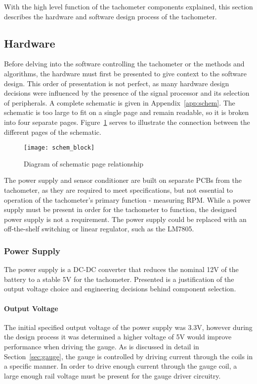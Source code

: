 With the high level function of the tachometer components explained, this section describes the hardware and software design process of the tachometer. 

\subsection{Hardware}
Before delving into the software controlling the tachometer or the methods and algorithms, the hardware must first be presented to give context to the software design. This order of presentation is not perfect, as many hardware design decisions were influenced by the presence of the signal processor and its selection of peripherals. A complete schematic is given in Appendix~\ref{app:schem}. The schematic is too large to fit on a single page and remain readable, so it is broken into four separate pages. Figure~\ref{fig:block_schem} serves to illustrate the connection between the different pages of the schematic.

\begin{figure}[H]
    \centering
    \texttt{[image: schem\_block]}
    \caption{Diagram of schematic page relationship}
    \label{fig:block_schem}
\end{figure}

The power supply and sensor conditioner are built on separate PCBs from the tachometer, as they are required to meet specifications, but not essential to operation of the tachometer's primary function - measuring RPM. While a power supply must be present in order for the tachometer to function, the designed power supply is not a requirement. The power supply could be replaced with an off-the-shelf switching  or linear regulator, such as the LM7805.

\subsubsection{Power Supply}
\label{sec:ps}
The power supply is a DC-DC converter that reduces the nominal 12V of the battery to a stable 5V for the tachometer. Presented is a justification of the output voltage choice and engineering decisions behind component selection.

\paragraph{Output Voltage}
The initial specified output voltage of the power supply was 3.3V, however during the design process it was determined a higher voltage of 5V would improve performance when driving the gauge. As is discussed in detail in Section~\ref{sec:gauge}, the gauge is controlled by driving current through the coils in a specific manner. In order to drive enough current through the gauge coil, a large enough rail voltage must be present for the gauge driver circuitry. 

